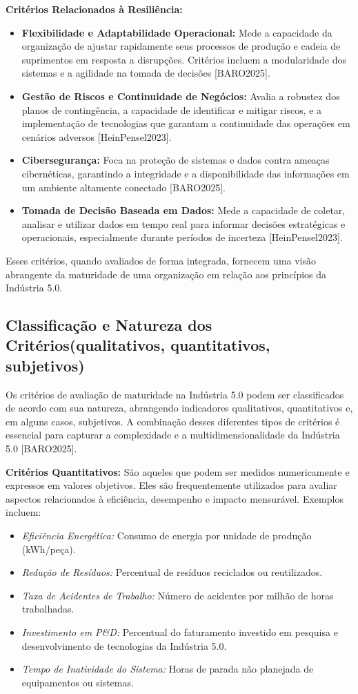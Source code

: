 \textbf{Critérios Relacionados à Resiliência:}
\begin{itemize}
    \item \textbf{Flexibilidade e Adaptabilidade Operacional:} Mede a capacidade da organização de ajustar rapidamente seus processos de produção e cadeia de suprimentos em resposta a disrupções. Critérios incluem a modularidade dos sistemas e a agilidade na tomada de decisões [BARO2025].
    \item \textbf{Gestão de Riscos e Continuidade de Negócios:} Avalia a robustez dos planos de contingência, a capacidade de identificar e mitigar riscos, e a implementação de tecnologias que garantam a continuidade das operações em cenários adversos [HeinPensel2023].
    \item \textbf{Cibersegurança:} Foca na proteção de sistemas e dados contra ameaças cibernéticas, garantindo a integridade e a disponibilidade das informações em um ambiente altamente conectado [BARO2025].
    \item \textbf{Tomada de Decisão Baseada em Dados:} Mede a capacidade de coletar, analisar e utilizar dados em tempo real para informar decisões estratégicas e operacionais, especialmente durante períodos de incerteza [HeinPensel2023].
\end{itemize}

Esses critérios, quando avaliados de forma integrada, fornecem uma visão abrangente da maturidade de uma organização em relação aos princípios da Indústria 5.0.

\subsection{Classificação e Natureza dos Critérios(qualitativos, quantitativos, subjetivos)}

Os critérios de avaliação de maturidade na Indústria 5.0 podem ser classificados de acordo com sua natureza, abrangendo indicadores qualitativos, quantitativos e, em alguns casos, subjetivos. A combinação desses diferentes tipos de critérios é essencial para capturar a complexidade e a multidimensionalidade da Indústria 5.0 [BARO2025].

\textbf{Critérios Quantitativos:}
São aqueles que podem ser medidos numericamente e expressos em valores objetivos. Eles são frequentemente utilizados para avaliar aspectos relacionados à eficiência, desempenho e impacto mensurável. Exemplos incluem:
\begin{itemize}
    \item \textit{Eficiência Energética:} Consumo de energia por unidade de produção (kWh/peça).
    \item \textit{Redução de Resíduos:} Percentual de resíduos reciclados ou reutilizados.
    \item \textit{Taxa de Acidentes de Trabalho:} Número de acidentes por milhão de horas trabalhadas.
    \item \textit{Investimento em P&D:} Percentual do faturamento investido em pesquisa e desenvolvimento de tecnologias da Indústria 5.0.
    \item \textit{Tempo de Inatividade do Sistema:} Horas de parada não planejada de equipamentos ou sistemas.
\end{itemize}

